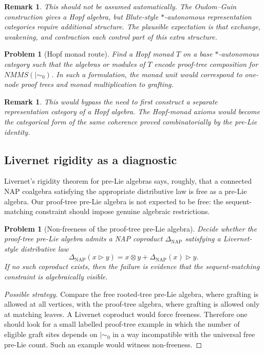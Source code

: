 \documentclass[11pt]{article}
\newtheorem{remark}[theorem]{Remark}
\newtheorem{problem}[theorem]{Problem}
\newcommand{\mszero}{\mathrel{\mid\!\sim_{0}}}
\newcommand{\NMMS}{\mathit{NMMS}}
\begin{document}
\begin{remark}
This should not be assumed automatically.  The Oudom--Guin construction gives
a Hopf algebra, but Blute-style \(\ast\)-autonomous representation categories
require additional structure.  The plausible expectation is that exchange,
weakening, and contraction each control part of this extra structure.
\end{remark}

\begin{problem}[Hopf monad route]
Find a Hopf monad \(T\) on a base \(\ast\)-autonomous category such that the
algebras or modules of \(T\) encode proof-tree composition for
\(\NMMS(\mszero)\).  In such a formulation, the monad unit would correspond
to one-node proof trees and monad multiplication to grafting.
\end{problem}

\begin{remark}
This would bypass the need to first construct a separate representation
category of a Hopf algebra.  The Hopf-monad axioms would become the categorical
form of the same coherence proved combinatorially by the pre-Lie identity.
\end{remark}

\subsection{Livernet rigidity as a diagnostic}

Livernet's rigidity theorem for pre-Lie algebras says, roughly, that a
connected NAP coalgebra satisfying the appropriate distributive law is free as
a pre-Lie algebra.  Our proof-tree pre-Lie algebra is not expected to be free:
the sequent-matching constraint should impose genuine algebraic restrictions.

\begin{problem}[Non-freeness of the proof-tree pre-Lie algebra]
Decide whether the proof-tree pre-Lie algebra admits a NAP coproduct
\(\Delta_{\mathrm{NAP}}\) satisfying a Livernet-style distributive law
\[
\Delta_{\mathrm{NAP}}(x\triangleright y)
=
x\otimes y+\Delta_{\mathrm{NAP}}(x)\triangleright y.
\]
If no such coproduct exists, then the failure is evidence that the
sequent-matching constraint is algebraically visible.
\end{problem}

\begin{proof}[Possible strategy]
Compare the free rooted-tree pre-Lie algebra, where grafting is allowed at all
vertices, with the proof-tree algebra, where grafting is allowed only at
matching leaves.  A Livernet coproduct would force freeness.  Therefore one
should look for a small labelled proof-tree example in which the number of
eligible graft sites depends on \(\mszero\) in a way incompatible with the
universal free pre-Lie count.  Such an example would witness non-freeness.
\end{proof}
\end{document}

